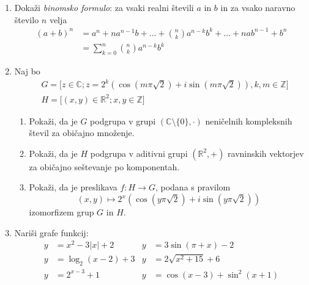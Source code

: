 \documentclass[a4paper,12pt]{article}
\begin{document}
\begin{enumerate}
\item Dokaži \emph{binomsko formulo}: za vsaki realni števili $ a $ in $ b $ in 
za vsako naravno število $ n $ velja
\begin{align*}    
(a + b)^n & = a^n + n a^{n - 1} b + \dots + \binom{n}{k} a^{n-k} b^k + \dots + n a b^{n - 1} + b^n \\ 
& = \sum_{k = 0}^n \binom{n}{k} a^{n-k} b^k     
\end{align*}

\item Naj bo
\begin{align*}
    & G = \lbrack z \in \mathbb{C}; z = 2^k(\cos(m \pi \sqrt{2}) + 
    i \sin(m \pi \sqrt{2})),k,m \in \mathbb{Z} \rbrack \\
    & H = \lbrack (x,y) \in \mathbb{R}^2;x,y \in \mathbb{Z}\rbrack
\end{align*}

\begin{enumerate}
\item Pokaži, da je $ G $ podgrupa v grupi 
$ (\mathbb{C} \setminus \{ 0 \},\cdot) $ neničelnih kompleksnih 
števil za običajno množenje.

\item Pokaži, da je $ H $ podgrupa v aditivni grupi $ (\mathbb{R}^2,+) $
ravninskih vektorjev za običajno seštevanje po komponentah.

\item Pokaži, da je preslikava $ f: H \to G $, podana s pravilom
$$ (x,y) \mapsto 2^x (\cos(y \pi \sqrt{2}) + 
i \sin(y \pi \sqrt{2})) $$ 
izomorfizem grup $ G $ in $ H $.

\end{enumerate}

\item Nariši grafe funkcij:
\begin{align*}
    y &= x^2 - 3 \vert x \vert + 2 &y &= 3 \sin(\pi + x) - 2  \\
    y &= \log_2 (x - 2) + 3 &y &= 2 \sqrt{x^2 + 15} + 6  \\
    y &= 2^{x - 3} + 1 &y &= \cos(x - 3) + \sin^2(x + 1) 
\end{align*}

\end{enumerate}
\end{document}

